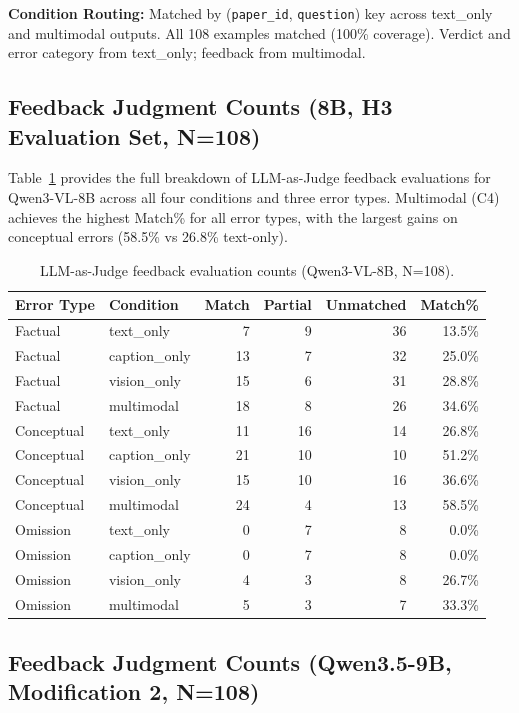 \documentclass{article}
\begin{document}
\textbf{Condition Routing:} Matched by (\texttt{paper\_id}, \texttt{question}) key
across text\_only and multimodal outputs. All 108 examples matched (100\% coverage).
Verdict and error category from text\_only; feedback from multimodal.

\subsection{Feedback Judgment Counts (8B, H3 Evaluation Set, N=108)}
\label{app:feedback_8b}

Table~\ref{tab:8b_feedback} provides the full breakdown of LLM-as-Judge feedback
evaluations for Qwen3-VL-8B across all four conditions and three error types.
Multimodal (C4) achieves the highest Match\% for all error types, with the
largest gains on conceptual errors (58.5\% vs 26.8\% text-only).

\begin{table}[h]
\centering
\small
\begin{tabular}{@{}llrrrr@{}}
\toprule
Error Type & Condition & Match & Partial & Unmatched & Match\% \\
\midrule
Factual    & text\_only    &  7 &  9 & 36 & 13.5\% \\
Factual    & caption\_only & 13 &  7 & 32 & 25.0\% \\
Factual    & vision\_only  & 15 &  6 & 31 & 28.8\% \\
Factual    & multimodal    & 18 &  8 & 26 & 34.6\% \\
Conceptual & text\_only    & 11 & 16 & 14 & 26.8\% \\
Conceptual & caption\_only & 21 & 10 & 10 & 51.2\% \\
Conceptual & vision\_only  & 15 & 10 & 16 & 36.6\% \\
Conceptual & multimodal    & 24 &  4 & 13 & 58.5\% \\
Omission   & text\_only    &  0 &  7 &  8 &  0.0\% \\
Omission   & caption\_only &  0 &  7 &  8 &  0.0\% \\
Omission   & vision\_only  &  4 &  3 &  8 & 26.7\% \\
Omission   & multimodal    &  5 &  3 &  7 & 33.3\% \\
\bottomrule
\end{tabular}
\caption{LLM-as-Judge feedback evaluation counts (Qwen3-VL-8B, N=108).}
\label{tab:8b_feedback}
\end{table}

\subsection{Feedback Judgment Counts (Qwen3.5-9B, Modification 2, N=108)}
\label{app:feedback_9b}
\end{document}
